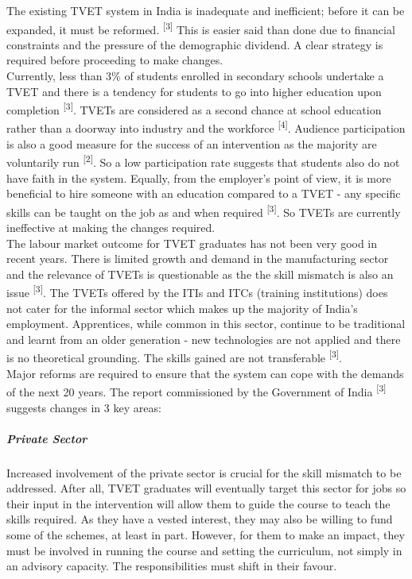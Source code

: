 \documentclass[a4paper, 10pt]{article}
\begin{document}
\noindent The existing TVET system in India is inadequate and inefficient; before it can be expanded, it must be reformed. \textsuperscript{[3]} This is easier said than done due to financial constraints and the pressure of the demographic dividend. A clear strategy is required before proceeding to make changes. \\

\noindent Currently, less than 3\% of students enrolled in secondary schools undertake a TVET and there is a tendency for students to go into higher education upon completion \textsuperscript{[3]}. TVETs are considered as a second chance at school education rather than a doorway into industry and the workforce \textsuperscript{[4]}. Audience participation is also a good measure for the success of an intervention as the majority are voluntarily run \textsuperscript{[2]}. So a low participation rate suggests that students also do not have faith in the system. Equally, from the employer's point of view, it is more beneficial to hire someone with an education compared to a TVET - any specific skills can be taught on the job as and when required \textsuperscript{[3]}. So TVETs are currently ineffective at making the changes required. \\

\noindent The labour market outcome for TVET graduates has not been very good in recent years. There is limited growth and demand in the manufacturing sector and the relevance of TVETs is questionable as the the skill mismatch is also an issue \textsuperscript{[3]}. The TVETs offered by the ITIs and ITCs (training institutions) does not cater for the informal sector which makes up the majority of India's employment. Apprentices, while common in this sector, continue to be traditional and learnt from an older generation - new technologies are not applied and there is no theoretical grounding. The skills gained are not transferable \textsuperscript{[3]}. \\

\noindent Major reforms are required to ensure that the system can cope with the demands of the next 20 years. The report commissioned by the Government of India \textsuperscript{[3]} suggests changes in 3 key areas:

\subparagraph*{Private Sector}
Increased involvement of the private sector is crucial for the skill mismatch to be addressed. After all, TVET graduates will eventually target this sector for jobs so their input in the intervention will allow them to guide the course to teach the skills required. As they have a vested interest, they may also be willing to fund some of the schemes, at least in part. However, for them to make an impact, they must be involved in running the course and setting the curriculum, not simply in an advisory capacity. The responsibilities must shift in their favour.
\end{document}
